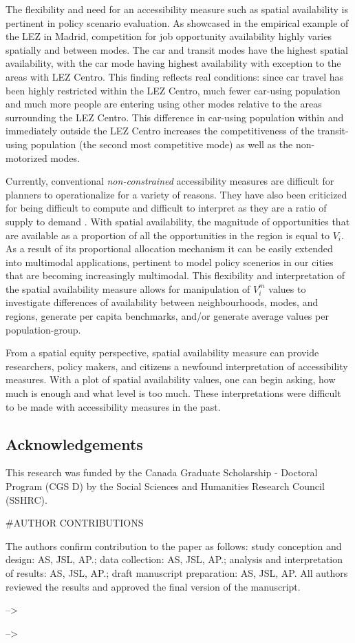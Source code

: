 \documentclass[numbered]{trbunofficial}
\begin{document}
The flexibility and need for an accessibility measure such as spatial
availability is pertinent in policy scenario evaluation. As showcased in
the empirical example of the LEZ in Madrid, competition for job
opportunity availability highly varies spatially and between modes. The
car and transit modes have the highest spatial availability, with the
car mode having highest availability with exception to the areas with
LEZ Centro. This finding reflects real conditions: since car travel has
been highly restricted within the LEZ Centro, much fewer car-using
population and much more people are entering using other modes relative
to the areas surrounding the LEZ Centro. This difference in car-using
population within and immediately outside the LEZ Centro increases the
competitiveness of the transit-using population (the second most
competitive mode) as well as the non-motorized modes.

Currently, conventional \emph{non-constrained} accessibility measures
are difficult for planners to operationalize for a variety of reasons.
They have also been criticized for being difficult to compute and
difficult to interpret as they are a ratio of supply to demand
\citep{levinsonTransportAccessManual2020}. With spatial availability,
the magnitude of opportunities that are available as a proportion of all
the opportunities in the region is equal to \(V_i\). As a result of its
proportional allocation mechanism it can be easily extended into
multimodal applications, pertinent to model policy scenerios in our
cities that are becoming increasingly multimodal. This flexibility and
interpretation of the spatial availability measure allows for
manipulation of \(V_i^m\) values to investigate differences of
availability between neighbourhoods, modes, and regions, generate per
capita benchmarks, and/or generate average values per population-group.

From a spatial equity perspective, spatial availability measure can
provide researchers, policy makers, and citizens a newfound
interpretation of accessibility measures. With a plot of spatial
availability values, one can begin asking, how much is enough and what
level is too much. These interpretations were difficult to be made with
accessibility measures in the past.

\hypertarget{acknowledgements}{%
\subsection{Acknowledgements}\label{acknowledgements}}

This research was funded by the Canada Graduate Scholarship - Doctoral
Program (CGS D) by the Social Sciences and Humanities Research Council
(SSHRC).

\#AUTHOR CONTRIBUTIONS

The authors confirm contribution to the paper as follows: study
conception and design: AS, JSL, AP.; data collection: AS, JSL, AP.;
analysis and interpretation of results: AS, JSL, AP.; draft manuscript
preparation: AS, JSL, AP. All authors reviewed the results and approved
the final version of the manuscript.

--\textgreater{}

--\textgreater{}

\newpage

\end{document}

